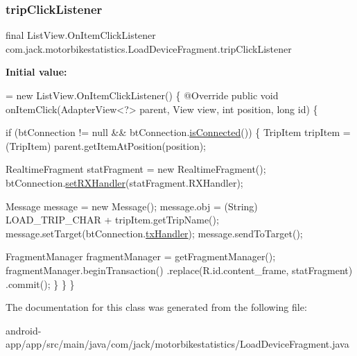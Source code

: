 \subsubsection{\texorpdfstring{trip\+Click\+Listener}{tripClickListener}}
{\footnotesize\ttfamily final List\+View.\+On\+Item\+Click\+Listener com.\+jack.\+motorbikestatistics.\+Load\+Device\+Fragment.\+trip\+Click\+Listener}

{\bfseries Initial value\+:}
\begin{DoxyCode}
= \textcolor{keyword}{new} ListView.OnItemClickListener() \{
        @Override
        \textcolor{keyword}{public} \textcolor{keywordtype}{void} onItemClick(AdapterView<?> parent, View view, \textcolor{keywordtype}{int} position, \textcolor{keywordtype}{long} \textcolor{keywordtype}{id}) \{

            \textcolor{keywordflow}{if} (btConnection != null && btConnection.\hyperlink{classcom_1_1jack_1_1motorbikestatistics_1_1_b_t_connection_a22f33e46d9f460d78865d4c63b645357}{isConnected}()) \{
                TripItem tripItem = (TripItem) parent.getItemAtPosition(position);

                
                RealtimeFragment statFragment = \textcolor{keyword}{new} RealtimeFragment();
                btConnection.\hyperlink{classcom_1_1jack_1_1motorbikestatistics_1_1_b_t_connection_aae8ee75e78f5beff98572bf3b13a60b8}{setRXHandler}(statFragment.RXHandler);

                
                Message message = \textcolor{keyword}{new} Message();
                message.obj = (String) LOAD\_TRIP\_CHAR + tripItem.getTripName();
                message.setTarget(btConnection.\hyperlink{classcom_1_1jack_1_1motorbikestatistics_1_1_b_t_connection_a7a88b2007af6a9a5c8667a9f1df980cc}{txHandler});
                message.sendToTarget();

                FragmentManager fragmentManager = getFragmentManager();
                fragmentManager.beginTransaction()
                        .replace(R.id.content\_frame, statFragment)
                        .commit();
            \}
        \}
    \}
\end{DoxyCode}


The documentation for this class was generated from the following file\+:\begin{DoxyCompactItemize}
\item 
android-\/app/app/src/main/java/com/jack/motorbikestatistics/Load\+Device\+Fragment.\+java\end{DoxyCompactItemize}
